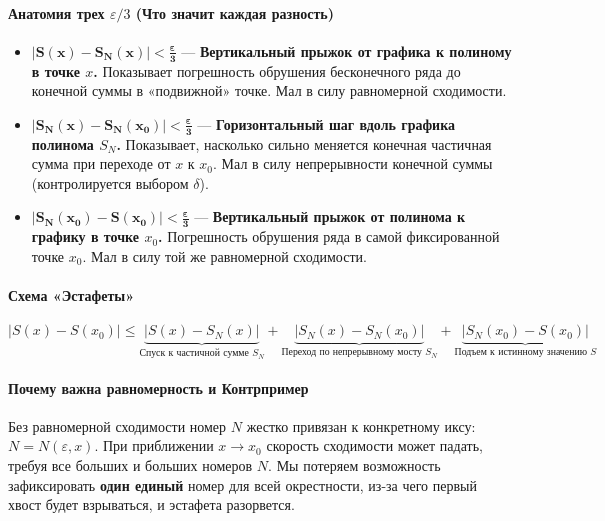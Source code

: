 \paragraph{Анатомия трех $\varepsilon/3$ (Что значит каждая разность)}
\begin{itemize}
    \item $\mathbf{|S(x) - S_N(x)| < \frac{\varepsilon}{3}}$ — \textbf{Вертикальный прыжок от графика к полиному в точке $x$.} Показывает погрешность обрушения бесконечного ряда до конечной суммы в «подвижной» точке. Мал в силу равномерной сходимости.
    \item $\mathbf{|S_N(x) - S_N(x_0)| < \frac{\varepsilon}{3}}$ — \textbf{Горизонтальный шаг вдоль графика полинома $S_N$.} Показывает, насколько сильно меняется конечная частичная сумма при переходе от $x$ к $x_0$. Мал в силу непрерывности конечной суммы (контролируется выбором $\delta$).
    \item $\mathbf{|S_N(x_0) - S(x_0)| < \frac{\varepsilon}{3}}$ — \textbf{Вертикальный прыжок от полинома к графику в точке $x_0$.} Погрешность обрушения ряда в самой фиксированной точке $x_0$. Мал в силу той же равномерной сходимости.
\end{itemize}

\paragraph{Схема «Эстафеты»}
$$ 
|S(x) - S(x_0)| \le \underbrace{|S(x) - S_N(x)|}_{\text{Спуск к частичной сумме } S_N} + \underbrace{|S_N(x) - S_N(x_0)|}_{\text{Переход по непрерывному мосту } S_N} + \underbrace{|S_N(x_0) - S(x_0)|}_{\text{Подъем к истинному значению } S}
$$

\paragraph{Почему важна равномерность и Контрпример} 
Без равномерной сходимости номер $N$ жестко привязан к конкретному иксу: $N = N(\varepsilon, x)$. При приближении $x \to x_0$ скорость сходимости может падать, требуя все больших и больших номеров $N$. Мы потеряем возможность зафиксировать \textbf{один единый} номер для всей окрестности, из-за чего первый хвост будет взрываться, и эстафета разорвется.

